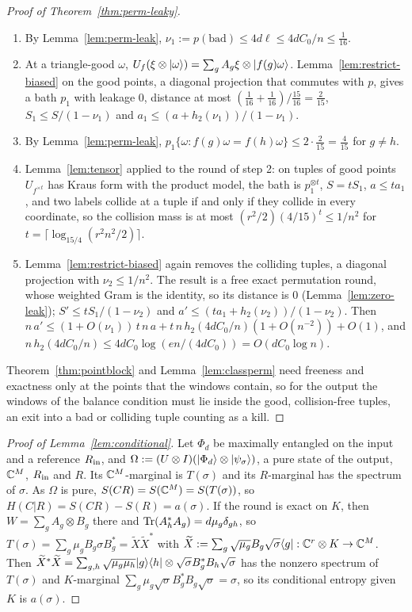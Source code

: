 \begin{proof}[Proof of Theorem~\ref{thm:perm-leaky}]
\begin{enumerate}[label=\arabic*.,itemsep=1pt]
\item By Lemma~\ref{lem:perm-leak}, $\nu_1:=p(\mathrm{bad})\le4d\ell\le4dC_0/n\le\frac1{16}$.
\item At a triangle-good $\omega$, $U_f(\xi\otimes\lvert \omega\rangle)=\sum_gA_g\xi\otimes\lvert f(g)\omega\rangle$. Lemma~\ref{lem:restrict-biased} on the good points, a diagonal projection that commutes
with $p$, gives a bath $p_1$ with leakage $0$, distance at most $(\frac1{16}+\frac1{16})/\frac{15}{16}=\frac2{15}$, $S_1\le S/(1-\nu_1)$ and $a_1\le(a+h_2(\nu_1))/(1-\nu_1)$.
\item By Lemma~\ref{lem:perm-leak}, $p_1\{\omega:f(g)\omega=f(h)\omega\}\le2\cdot\frac2{15}=\frac4{15}$ for $g\ne h$.
\item Lemma~\ref{lem:tensor} applied to the round of step 2: on tuples of good points $U_{f^{\times t}}$ has Kraus form with the product model, the bath is $p_1^{\otimes t}$, $S=tS_1$,
$a\le ta_1$, and two labels collide at a tuple if and only if they collide in every coordinate, so the collision mass is at most $(r^2/2)(4/15)^t\le1/n^2$ for
$t=\lceil\log_{15/4}(r^2n^2/2)\rceil$.
\item Lemma~\ref{lem:restrict-biased} again removes the colliding tuples, a diagonal projection with $\nu_2\le1/n^2$. The result is a free exact permutation round, whose
weighted Gram is the identity, so its distance is $0$ (Lemma~\ref{lem:zero-leak}); $S'\le tS_1/(1-\nu_2)$ and $a'\le(ta_1+h_2(\nu_2))/(1-\nu_2)$. Then
$n\,a'\le(1+O(\nu_1))\,t\,n\,a+t\,n\,h_2(4dC_0/n)(1+O(n^{-2}))+O(1)$, and $n\,h_2(4dC_0/n)\le4dC_0\log(en/(4dC_0))=O(dC_0\log n)$.
\end{enumerate}
Theorem~\ref{thm:pointblock} and Lemma~\ref{lem:classperm} need freeness and exactness only at the points that the windows contain, so for the output the windows of the balance
condition must lie inside the good, collision-free tuples, an exit into a bad or colliding tuple counting as a kill.
\end{proof}

\begin{proof}[Proof of Lemma~\ref{lem:conditional}]
Let $\Phi_d$ be maximally entangled on the input and a reference $R_{\rm in}$, and $\Omega:=(U\otimes I)(\lvert \Phi_d\rangle\otimes\lvert \psi_\sigma\rangle)$, a pure state of the output, $\mathbb C^M$,
$R_{\rm in}$ and $R$. Its $\mathbb C^M$-marginal is $T(\sigma)$ and its $R$-marginal has the spectrum of $\sigma$. As $\Omega$ is pure, $S(CR)=S(\mathbb C^M)=S(T(\sigma))$, so
$H(C|R)=S(CR)-S(R)=a(\sigma)$. If the round is exact on $K$, then $W=\sum_gA_g\otimes B_g$ there and $\operatorname{Tr}(A_h^*A_g)=d\mu_g\delta_{gh}$, so
$T(\sigma)=\sum_g\mu_gB_g\sigma B_g^*=\widetilde X\widetilde X^*$ with $\widetilde X:=\sum_g\sqrt{\mu_g}B_g\sqrt\sigma\langle g\rvert:\mathbb C^r\otimes K\to\mathbb C^M$. Then
$\widetilde X^*\widetilde X=\sum_{g,h}\sqrt{\mu_g\mu_h}\lvert g\rangle\langle h\rvert\otimes\sqrt\sigma B_g^*B_h\sqrt\sigma$ has the nonzero spectrum of $T(\sigma)$ and $K$-marginal
$\sum_g\mu_g\sqrt\sigma B_g^*B_g\sqrt\sigma=\sigma$, so its conditional entropy given $K$ is $a(\sigma)$.
\end{proof}

